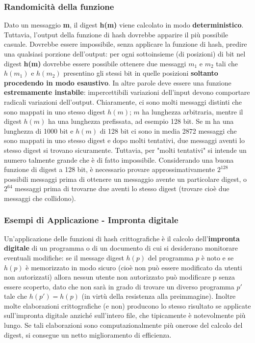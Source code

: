 \subsubsection{Randomicità della funzione}
Dato un messaggio \textbf{m}, il digest \textbf{h(m)} viene calcolato in modo \textbf{deterministico}. Tuttavia, l'output della funzione di hash dovrebbe apparire il più possibile casuale. Dovrebbe essere impossibile, senza applicare la funzione di hash, predire una qualsiasi porzione dell'output: per ogni sottoinsieme (di posizioni) di bit nel digest \textbf{h(m)} dovrebbe essere possibile ottenere due messaggi $m_{1}$ e $m_{2}$ tali che $h(m_{1})$ e $h(m_{2})$ presentino gli stessi bit in quelle posizioni \textbf{soltanto procedendo in modo esaustivo}. In altre parole deve essere una funzione \textbf{estremamente instabile}: impercettibili variazioni dell'input devono comportare radicali variazioni dell'output.
\newline \newline
Chiaramente, ci sono molti messaggi distinti che sono mappati in uno stesso digest $h(m)$; $m$ ha lunghezza arbitraria, mentre il digest $h(m)$ ha una lunghezza prefissata, ad esempio 128 bit. Se m ha una lunghezza di 1000 bit e $h(m)$ di 128 bit ci sono in media 2872 messaggi che sono mappati in uno stesso digest e dopo molti tentativi, due messaggi aventi lo stesso digest si trovano sicuramente. Tuttavia, per "molti tentativi" si intende un numero talmente grande che è di fatto impossibile. Considerando una buona funzione di digest a 128 bit, è necessario provare approssimativamente $2^{128}$ possibili messaggi prima di ottenere un messaggio avente un particolare digest, o $2^{64}$ messaggi prima di trovarne due aventi lo stesso digest (trovare cioè due messaggi che collidono).

\subsubsection{Esempi di Applicazione - Impronta digitale}
Un'applicazione delle funzioni di hash crittografiche è il calcolo dell'\textbf{impronta digitale} di un programma o di un documento di cui si desiderano monitorare eventuali modifiche: se il message digest $h(p)$ del programma $p$ è noto e se $h(p)$ è memorizzato in modo sicuro (cioè non può essere modificato da utenti non autorizzati) allora nessun utente non autorizzato può modificare p senza essere scoperto, dato che non sarà in grado di trovare un diverso programma $p'$ tale che $h(p') = h(p)$ (in virtù della resistenza alla preimmagine). Inoltre molte elaborazioni crittografiche (e non) producono lo stesso risultato se applicate sull'impronta digitale anziché sull'intero file, che tipicamente è notevolmente più lungo. Se tali elaborazioni sono computazionalmente più onerose del calcolo del digest, si consegue un netto miglioramento di efficienza.

